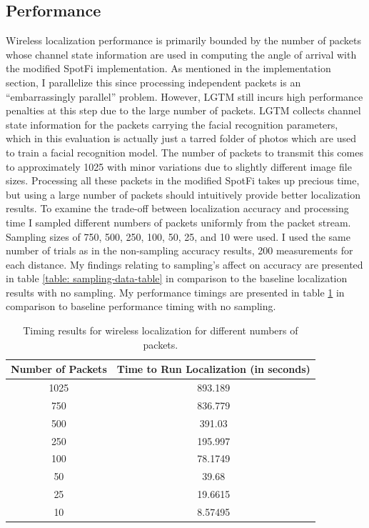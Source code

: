 \documentclass[12pt]{report}
\begin{document}
\subsection{Performance}
Wireless localization performance is primarily bounded by the number of packets whose channel state information are used in computing the angle of arrival with the modified SpotFi implementation. As mentioned in the implementation section, I parallelize this since processing independent packets is an ``embarrassingly parallel'' problem. However, LGTM still incurs high performance penalties at this step due to the large number of packets. LGTM collects channel state information for the packets carrying the facial recognition parameters, which in this evaluation is actually just a tarred folder of photos which are used to train a facial recognition model. The number of packets to transmit this comes to approximately 1025 with minor variations due to slightly different image file sizes. Processing all these packets in the modified SpotFi takes up precious time, but using a large number of packets should intuitively provide better localization results. To examine the trade-off between localization accuracy and processing time I sampled different numbers of packets uniformly from the packet stream. Sampling sizes of 750, 500, 250, 100, 50, 25, and 10 were used. I used the same number of trials as in the non-sampling accuracy results, 200 measurements for each distance. My findings relating to sampling's affect on accuracy are presented in table \ref{table: sampling-data-table} in comparison to the baseline localization results with no sampling. My performance timings are presented in table \ref{table: sampling-timing-data} in comparison to baseline performance timing with no sampling. \par

\begin{table}[!htb]
    \begin{center}
        \caption{Timing results for wireless localization for different numbers of packets.}
        \label{table: sampling-timing-data}
        \begin{tabular}{| c | c |}
            \hline
            Number of Packets & Time to Run Localization (in seconds) \\
            \hline
            \hline
            1025 & 893.189 \\
            \hline
            750 & 836.779 \\
            \hline
            500 & 391.03 \\
            \hline
            250 & 195.997 \\
            \hline
            100 & 78.1749 \\
            \hline
            50 & 39.68 \\
            \hline
            25 & 19.6615 \\
            \hline
            10 & 8.57495 \\
            \hline
        \end{tabular}
    \end{center}
\end{table}
\end{document}
